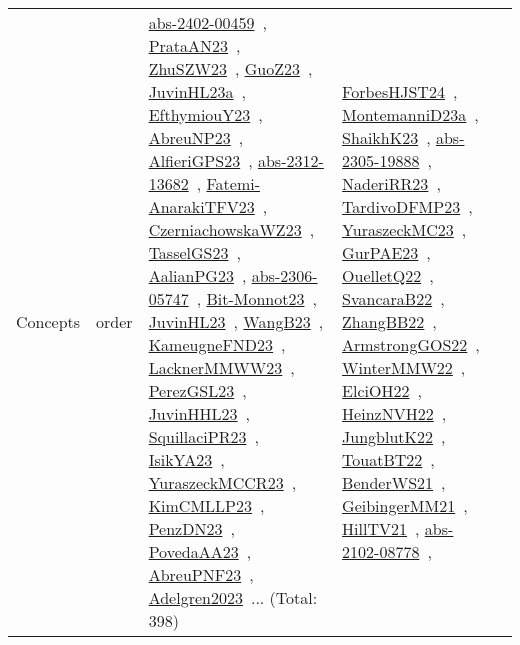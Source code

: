 {\begin{longtable}{lp{3cm}>{\raggedright\arraybackslash}p{6cm}>{\raggedright\arraybackslash}p{6cm}>{\raggedright\arraybackslash}p{8cm}}
Concepts & order & \href{works/abs-2402-00459.pdf}{abs-2402-00459}~\cite{abs-2402-00459}, \href{works/PrataAN23.pdf}{PrataAN23}~\cite{PrataAN23}, \href{works/ZhuSZW23.pdf}{ZhuSZW23}~\cite{ZhuSZW23}, \href{works/GuoZ23.pdf}{GuoZ23}~\cite{GuoZ23}, \href{works/JuvinHL23a.pdf}{JuvinHL23a}~\cite{JuvinHL23a}, \href{works/EfthymiouY23.pdf}{EfthymiouY23}~\cite{EfthymiouY23}, \href{works/AbreuNP23.pdf}{AbreuNP23}~\cite{AbreuNP23}, \href{works/AlfieriGPS23.pdf}{AlfieriGPS23}~\cite{AlfieriGPS23}, \href{works/abs-2312-13682.pdf}{abs-2312-13682}~\cite{abs-2312-13682}, \href{works/Fatemi-AnarakiTFV23.pdf}{Fatemi-AnarakiTFV23}~\cite{Fatemi-AnarakiTFV23}, \href{works/CzerniachowskaWZ23.pdf}{CzerniachowskaWZ23}~\cite{CzerniachowskaWZ23}, \href{works/TasselGS23.pdf}{TasselGS23}~\cite{TasselGS23}, \href{works/AalianPG23.pdf}{AalianPG23}~\cite{AalianPG23}, \href{works/abs-2306-05747.pdf}{abs-2306-05747}~\cite{abs-2306-05747}, \href{works/Bit-Monnot23.pdf}{Bit-Monnot23}~\cite{Bit-Monnot23}, \href{works/JuvinHL23.pdf}{JuvinHL23}~\cite{JuvinHL23}, \href{works/WangB23.pdf}{WangB23}~\cite{WangB23}, \href{works/KameugneFND23.pdf}{KameugneFND23}~\cite{KameugneFND23}, \href{works/LacknerMMWW23.pdf}{LacknerMMWW23}~\cite{LacknerMMWW23}, \href{works/PerezGSL23.pdf}{PerezGSL23}~\cite{PerezGSL23}, \href{works/JuvinHHL23.pdf}{JuvinHHL23}~\cite{JuvinHHL23}, \href{works/SquillaciPR23.pdf}{SquillaciPR23}~\cite{SquillaciPR23}, \href{works/IsikYA23.pdf}{IsikYA23}~\cite{IsikYA23}, \href{works/YuraszeckMCCR23.pdf}{YuraszeckMCCR23}~\cite{YuraszeckMCCR23}, \href{works/KimCMLLP23.pdf}{KimCMLLP23}~\cite{KimCMLLP23}, \href{works/PenzDN23.pdf}{PenzDN23}~\cite{PenzDN23}, \href{works/PovedaAA23.pdf}{PovedaAA23}~\cite{PovedaAA23}, \href{works/AbreuPNF23.pdf}{AbreuPNF23}~\cite{AbreuPNF23}, \href{works/Adelgren2023.pdf}{Adelgren2023}~\cite{Adelgren2023}... (Total: 398) & \href{works/ForbesHJST24.pdf}{ForbesHJST24}~\cite{ForbesHJST24}, \href{works/MontemanniD23a.pdf}{MontemanniD23a}~\cite{MontemanniD23a}, \href{works/ShaikhK23.pdf}{ShaikhK23}~\cite{ShaikhK23}, \href{works/abs-2305-19888.pdf}{abs-2305-19888}~\cite{abs-2305-19888}, \href{works/NaderiRR23.pdf}{NaderiRR23}~\cite{NaderiRR23}, \href{works/TardivoDFMP23.pdf}{TardivoDFMP23}~\cite{TardivoDFMP23}, \href{works/YuraszeckMC23.pdf}{YuraszeckMC23}~\cite{YuraszeckMC23}, \href{works/GurPAE23.pdf}{GurPAE23}~\cite{GurPAE23}, \href{works/OuelletQ22.pdf}{OuelletQ22}~\cite{OuelletQ22}, \href{works/SvancaraB22.pdf}{SvancaraB22}~\cite{SvancaraB22}, \href{works/ZhangBB22.pdf}{ZhangBB22}~\cite{ZhangBB22}, \href{works/ArmstrongGOS22.pdf}{ArmstrongGOS22}~\cite{ArmstrongGOS22}, \href{works/WinterMMW22.pdf}{WinterMMW22}~\cite{WinterMMW22}, \href{works/ElciOH22.pdf}{ElciOH22}~\cite{ElciOH22}, \href{works/HeinzNVH22.pdf}{HeinzNVH22}~\cite{HeinzNVH22}, \href{works/JungblutK22.pdf}{JungblutK22}~\cite{JungblutK22}, \href{works/TouatBT22.pdf}{TouatBT22}~\cite{TouatBT22}, \href{works/BenderWS21.pdf}{BenderWS21}~\cite{BenderWS21}, \href{works/GeibingerMM21.pdf}{GeibingerMM21}~\cite{GeibingerMM21}, \href{works/HillTV21.pdf}{HillTV21}~\cite{HillTV21}, \href{works/abs-2102-08778.pdf}{abs-2102-08778}~\cite{abs-2102-08778}, 
\end{longtable}}
